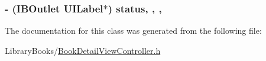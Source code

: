 \subsubsection[{status}]{\setlength{\rightskip}{0pt plus 5cm}-\/ (I\+B\+Outlet U\+I\+Label$\ast$) status\hspace{0.3cm}{\ttfamily [read]}, {\ttfamily [write]}, {\ttfamily [nonatomic]}, {\ttfamily [weak]}}\label{interface_book_detail_view_controller_a7a734fdbd38ad55ff9dd7a1eac4f7851}


The documentation for this class was generated from the following file\+:\begin{DoxyCompactItemize}
\item 
Library\+Books/\hyperlink{_book_detail_view_controller_8h}{Book\+Detail\+View\+Controller.\+h}\end{DoxyCompactItemize}
